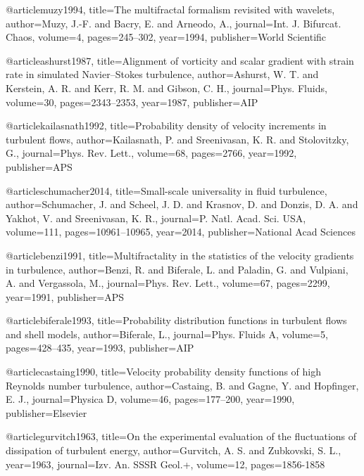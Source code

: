 @article{muzy1994,
  title={{The multifractal formalism revisited with wavelets}},
  author={Muzy, J.-F. and Bacry, E. and Arneodo, A.},
  journal={Int. J. Bifurcat. Chaos},
  volume={4},
  pages={245--302},
  year={1994},
  publisher={World Scientific}
}

@article{ashurst1987,
  title={{Alignment of vorticity and scalar gradient with strain rate in simulated Navier--Stokes turbulence}},
  author={Ashurst, W. T. and Kerstein, A. R. and Kerr, R. M. and Gibson, C. H.},
  journal={Phys. Fluids},
  volume={30},
  pages={2343--2353},
  year={1987},
  publisher={AIP}
}

@article{kailasnath1992,
  title={{Probability density of velocity increments in turbulent flows}},
  author={Kailasnath, P. and Sreenivasan, K. R. and Stolovitzky, G.},
  journal={Phys. Rev. Lett.},
  volume={68},
  pages={2766},
  year={1992},
  publisher={APS}
}


@article{schumacher2014,
  title={{Small-scale universality in fluid turbulence}},
  author={Schumacher, J. and Scheel, J. D. and Krasnov, D. and Donzis, D. A. and Yakhot, V. and Sreenivasan, K. R.},
  journal={P. Natl. Acad. Sci. USA},
  volume={111},
  pages={10961--10965},
  year={2014},
  publisher={National Acad Sciences}
}

@article{benzi1991,
  title={{Multifractality in the statistics of the velocity gradients in turbulence}},
  author={Benzi, R. and Biferale, L. and Paladin, G. and Vulpiani, A. and Vergassola, M.},
  journal={Phys. Rev. Lett.},
  volume={67},
  pages={2299},
  year={1991},
  publisher={APS}
}

@article{biferale1993,
  title={{Probability distribution functions in turbulent flows and shell models}},
  author={Biferale, L.},
  journal={Phys. Fluids A},
  volume={5},
  pages={428--435},
  year={1993},
  publisher={AIP}
}

@article{castaing1990,
  title={{Velocity probability density functions of high Reynolds number turbulence}},
  author={Castaing, B. and Gagne, Y. and Hopfinger, E. J.},
  journal={Physica D},
  volume={46},
  pages={177--200},
  year={1990},
  publisher={Elsevier}
}

@article{gurvitch1963,
  title={On the experimental evaluation of the fluctuations of dissipation of turbulent energy},
  author={Gurvitch, A. S. and Zubkovski, S. L.},
  year={1963},
  journal={Izv. An. SSSR Geol.+},
  volume={12},
  pages={1856-1858}
  }

